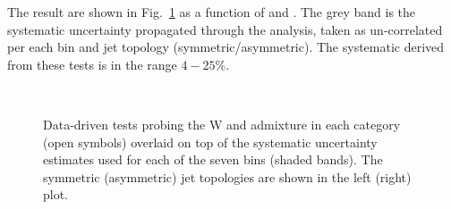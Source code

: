 The result are shown in Fig.~\ref{fig:closureBTag} as a function of \scalht and \njet. 
The grey band is the systematic uncertainty propagated through the analysis, 
taken as un-correlated per each \scalht bin and jet topology (symmetric/asymmetric). The systematic derived from these tests is
in the range $4-25\%$.

\begin{figure}[h!]
  \begin{center}
    ~~
    \caption{Data-driven tests probing the W and \ttbar admixture 
      in each \njet category (open symbols) overlaid on top of the systematic
      uncertainty estimates used for each of the seven \scalht bins
      (shaded bands). 
      The symmetric (asymmetric) jet topologies are shown in the left (right) plot.      
    }
    \label{fig:closureBTag}
  \end{center} 
\end{figure}


